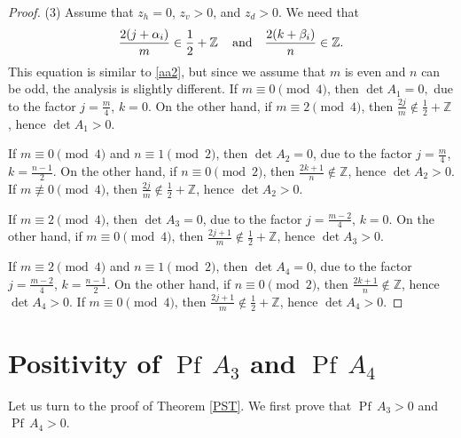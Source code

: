 \documentclass[12pt,reqno]{amsart}
\numberwithin{equation}{section}
\newcommand{\Z}{{\mathbb Z}}
\newcommand{\Pf}{{\operatorname{Pf}\,}}
\begin{document}
\begin{proof}
(3) Assume that $z_h=0$, $z_v>0$, and $z_d>0$.  We need that
\begin{equation}\label{aa3}
\begin{aligned}
\frac{2(j+\alpha_i)}{m}\in\frac{1}{2}+\Z\,\quad {\rm and} \quad 
\frac{2(k+\beta_i)}{n}\in\Z.
\end{aligned}
\end{equation}
This equation is similar to \eqref{aa2}, but since we assume that $m$ is even and $n$ can be odd,
the analysis is slightly different.
If $m\equiv 0 \pmod 4$, then $\det A_1=0,$ due to the factor $j=\frac{m}{4}$, $k=0.$ 
On the other hand, if $m\equiv 2 \pmod 4$, then $\frac{2 j}{m}\not\in\frac{1}{2}+\Z$, hence $\det A_1>0$. 

If $m\equiv 0 \pmod 4$ and $n\equiv 1 \pmod 2$, then $\det A_2=0$, due to the factor $j=\frac{m}{4}$, $k=\frac{n-1}{2}$. On the other hand,
if $n\equiv 0 \pmod 2$, then 
$\frac{2k+1}{n}\not \in\Z$, hence $\det A_2>0$. If $m\not\equiv 0 \pmod 4$, 
then $\frac{2j}{m}\not\in \frac{1}{2} +\Z$, 
hence $\det A_2>0.$

If $m\equiv 2 \pmod 4$, then $\det A_3=0$, due to the factor $j=\frac{m-2}{4}$, $k=0$. On the other hand, 
if  $m\equiv 0 \pmod 4$,
then $\frac{2j+1}{m}\not\in \frac{1}{2} +\Z$, hence $\det A_3>0$.

If $m\equiv 2 \pmod 4$ and $n\equiv 1 \pmod 2$, then $\det A_4=0$, due to the factor $j=\frac{m-2}{4}$, $k=\frac{n-1}{2}$. 
On the other hand, if $n\equiv 0 \pmod 2$, then $\frac{2k+1}{n}\not\in\Z$, hence $\det A_4>0$.
If $m\equiv 0 \pmod 4$, then $\frac{2j+1}{m}\not\in \frac{1}{2} +\Z$, hence $\det A_4>0$. 
\end{proof}

\section{Positivity of $\Pf A_3$ and $\Pf A_4$} \label{A34}

Let us turn to the proof of Theorem \ref{PST}.
We first prove that
 $\Pf A_3>0$ and $\Pf A_4>0$.

\vskip 2mm
\end{document}
